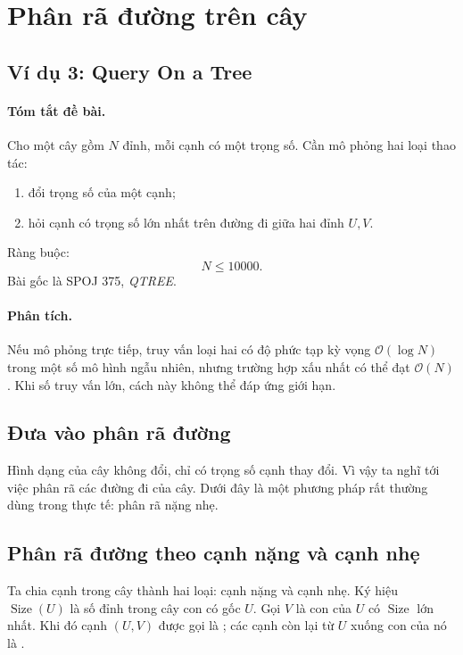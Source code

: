 \documentclass[11pt]{article}
\newcommand{\Oh}{\mathcal{O}}
\newcommand{\Size}{\operatorname{Size}}
\begin{document}
\section{Phân rã đường trên cây}

\subsection{Ví dụ 3: Query On a Tree}

\paragraph{Tóm tắt đề bài.}
Cho một cây gồm \(N\) đỉnh, mỗi cạnh có một trọng số. Cần mô phỏng hai loại
thao tác:
\begin{enumerate}
  \item đổi trọng số của một cạnh;
  \item hỏi cạnh có trọng số lớn nhất trên đường đi giữa hai đỉnh \(U,V\).
\end{enumerate}
Ràng buộc:
\[
  N\le 10000.
\]
Bài gốc là SPOJ 375, \textit{QTREE}.

\paragraph{Phân tích.}
Nếu mô phỏng trực tiếp, truy vấn loại hai có độ phức tạp kỳ vọng
\(\Oh(\log N)\) trong một số mô hình ngẫu nhiên, nhưng trường hợp xấu nhất có
thể đạt \(\Oh(N)\). Khi số truy vấn lớn, cách này không thể đáp ứng giới hạn.

\subsection{Đưa vào phân rã đường}

Hình dạng của cây không đổi, chỉ có trọng số cạnh thay đổi. Vì vậy ta nghĩ tới
việc phân rã các đường đi của cây. Dưới đây là một phương pháp rất thường dùng
trong thực tế: phân rã nặng nhẹ.

\subsection{Phân rã đường theo cạnh nặng và cạnh nhẹ}

Ta chia cạnh trong cây thành hai loại: cạnh nặng và cạnh nhẹ. Ký hiệu
\(\Size(U)\) là số đỉnh trong cây con có gốc \(U\). Gọi \(V\) là con của
\(U\) có \(\Size\) lớn nhất. Khi đó cạnh \((U,V)\) được gọi là ; các cạnh còn lại từ \(U\) xuống con của nó là .
\end{document}
